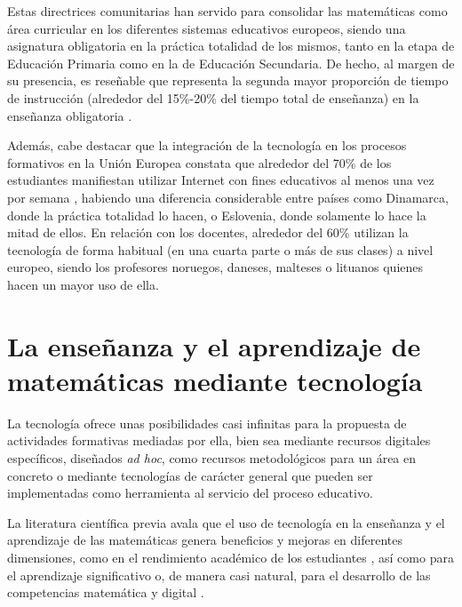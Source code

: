 \documentclass[spanish]{textolivre}
\begin{document}
Estas directrices comunitarias han servido para consolidar las matemáticas como área curricular en los diferentes sistemas educativos europeos, siendo una asignatura obligatoria en la práctica totalidad de los mismos, tanto en la etapa de Educación Primaria como en la de Educación Secundaria. De hecho, al margen de su presencia, es reseñable que representa la segunda mayor proporción de tiempo de instrucción (alrededor del 15\%-20\% del tiempo total de enseñanza) en la enseñanza obligatoria \cite{comision_recommended_2021}.

Además, cabe destacar que la integración de la tecnología en los procesos formativos en la Unión Europea constata que alrededor del 70\% de los estudiantes manifiestan utilizar Internet con fines educativos al menos una vez por semana \cite{comision_2nd_2019}, habiendo una diferencia considerable entre países como Dinamarca, donde la práctica totalidad lo hacen, o Eslovenia, donde solamente lo hace la mitad de ellos. En relación con los docentes, alrededor del 60\% utilizan la tecnología de forma habitual (en una cuarta parte o más de sus clases) a nivel europeo, siendo los profesores noruegos, daneses, malteses o lituanos quienes hacen un mayor uso de ella.

\section{La enseñanza y el aprendizaje de matemáticas mediante tecnología}

La tecnología ofrece unas posibilidades casi infinitas para la propuesta de actividades formativas mediadas por ella, bien sea mediante recursos digitales específicos, diseñados \textit{ad hoc}, como recursos metodológicos para un área en concreto o mediante tecnologías de carácter general que pueden ser implementadas como herramienta al servicio del proceso educativo.

La literatura científica previa avala que el uso de tecnología en la enseñanza y el aprendizaje de las matemáticas genera beneficios y mejoras en diferentes dimensiones, como en el rendimiento académico de los estudiantes \cite{martinez-garrido_impacto_2018}, así como para el aprendizaje significativo \cite{nivela__diseno_2018} o, de manera casi natural, para el desarrollo de las competencias matemática y digital \cite{valverde-crespo_competencia_2018}.
\end{document}
